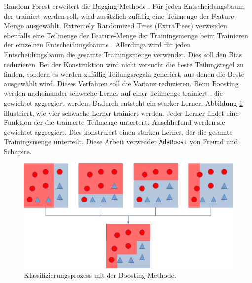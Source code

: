 \newline
\newline
Random Forest erweitert die Bagging-Methode \cite{breiman2001random}. Für jeden Entscheidungsbaum der trainiert werden soll, wird zusätzlich zufällig eine Teilmenge der Feature-Menge ausgewählt.
\newline
\newline
Extremely Randomized Trees (ExtraTrees) verwenden ebenfalls eine Teilmenge der Feature-Menge der Trainingsmenge beim Trainieren der einzelnen Entscheidungsbäume \cite{geurts2006extremely}.
Allerdings wird für jeden Entscheidungsbaum die gesamte Trainingsmenge verwendet. Dies soll den Bias reduzieren. Bei der Konstruktion wird nicht versucht die beste Teilungsregel zu finden,
sondern es werden zufällig Teilungsregeln generiert, aus denen die Beste ausgewählt wird. Dieses Verfahren soll die Varianz reduzieren.
\newline
\newline
Beim Boosting werden nacheinander schwache Lerner auf einer Teilmenge trainiert \cite{freund1997decision}, die gewichtet aggregiert werden. Dadurch entsteht ein starker Lerner.
Abbildung \ref{fig:boosting} illustriert, wie vier schwache Lerner trainiert werden. Jeder Lerner findet eine Funktion der die trainierte Teilmenge unterteilt. Anschließend
werden sie gewichtet aggregiert. Dies konstruiert einen starken Lerner, der die gesamte Trainingsmenge unterteilt. Diese Arbeit verwendet \texttt{AdaBoost} \cite{freund1997decision} von Freund und Schapire.
\begin{figure}[h!]
    \centering
    \includegraphics[width=\linewidth]{images/boosting.jpg}
    \caption{Klassifizierungsprozess mit der Boosting-Methode.}
    \label{fig:boosting}
\end{figure}